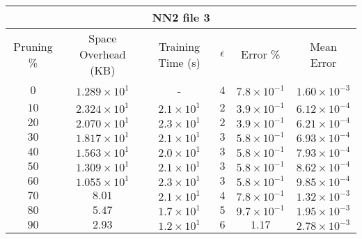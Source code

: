 \begin{adjustwidth}{0cm}{}
\begin{tabular}{cccccc}
\hline
\multicolumn{6}{c}{NN2 file 3} \\
\toprule
Pruning \% & Space Overhead (KB) & Training Time (s) & $\epsilon$ & Error \% & Mean Error\\
\midrule
$0$ & $1.289 \times 10^{1}$ & - & $4$ & $7.8 \times 10^{-1}$ & $1.60 \times 10^{-3}$\\
$10$ & $2.324 \times 10^{1}$ & $2.1 \times 10^{1}$ & $2$ & $3.9 \times 10^{-1}$ & $6.12 \times 10^{-4}$\\
$20$ & $2.070 \times 10^{1}$ & $2.3 \times 10^{1}$ & $2$ & $3.9 \times 10^{-1}$ & $6.21 \times 10^{-4}$\\
$30$ & $1.817 \times 10^{1}$ & $2.1 \times 10^{1}$ & $3$ & $5.8 \times 10^{-1}$ & $6.93 \times 10^{-4}$\\
$40$ & $1.563 \times 10^{1}$ & $2.0 \times 10^{1}$ & $3$ & $5.8 \times 10^{-1}$ & $7.93 \times 10^{-4}$\\
$50$ & $1.309 \times 10^{1}$ & $2.1 \times 10^{1}$ & $3$ & $5.8 \times 10^{-1}$ & $8.62 \times 10^{-4}$\\
$60$ & $1.055 \times 10^{1}$ & $2.3 \times 10^{1}$ & $3$ & $5.8 \times 10^{-1}$ & $9.85 \times 10^{-4}$\\
$70$ & $8.01$ & $2.1 \times 10^{1}$ & $4$ & $7.8 \times 10^{-1}$ & $1.32 \times 10^{-3}$\\
$80$ & $5.47$ & $1.7 \times 10^{1}$ & $5$ & $9.7 \times 10^{-1}$ & $1.95 \times 10^{-3}$\\
$90$ & $2.93$ & $1.2 \times 10^{1}$ & $6$ & $1.17$ & $2.78 \times 10^{-3}$\\
\bottomrule
\end{tabular}
\end{adjustwidth}

\par\null\par
\par\null\par

